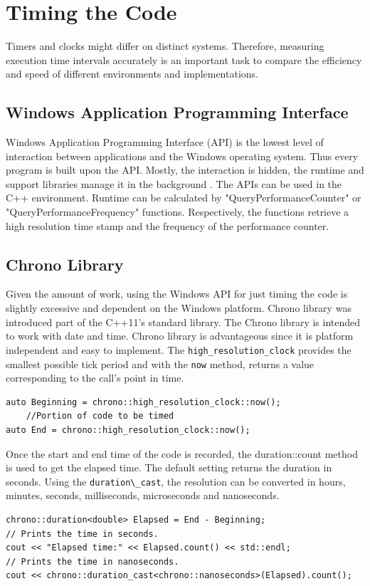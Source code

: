 \documentclass[12pt, oneside]{book}
\theoremstyle{plain}
\theoremstyle{definition}
\begin{document}
\section{Timing the Code}
Timers and clocks might differ on distinct systems. Therefore, measuring execution time intervals accurately is an important task to compare the efficiency and speed of different environments and implementations. 

\subsection{Windows Application Programming Interface}
Windows Application Programming Interface (API) is the lowest level of interaction between applications and the Windows operating system. Thus every program is built upon  the API. Mostly, the interaction is hidden, the runtime and support libraries manage it in the background \cite{windows}. The APIs can be used in the C++ environment. Runtime can be calculated by "QueryPerformanceCounter" or "QueryPerformanceFrequency"  functions. Respectively, the functions retrieve a high resolution time stamp and the frequency of the performance counter. 

\subsection{Chrono Library}
Given the amount of work, using the Windows API for just timing the code is slightly excessive and dependent on the Windows platform. Chrono library was introduced part of the C++11’s standard library. The Chrono library is intended to work with date and time. Chrono library is advantageous since it is platform independent and easy to implement. The \verb!high_resolution_clock! provides the smallest possible tick period and with the \verb!now! method, returns a value corresponding to the call’s point in time. 
\begin{verbatim}
auto Beginning = chrono::high_resolution_clock::now();
    //Portion of code to be timed
auto End = chrono::high_resolution_clock::now();
\end{verbatim}
Once the start and end time of the code is recorded, the duration::count method is used to get the elapsed time. The default setting returns the duration in seconds. Using the \verb!duration\_cast!, the resolution can be converted in hours, minutes, seconds, milliseconds, microseconds and nanoseconds.
\begin{verbatim}
chrono::duration<double> Elapsed = End - Beginning;
// Prints the time in seconds.
cout << "Elapsed time:" << Elapsed.count() << std::endl;
// Prints the time in nanoseconds. 
cout << chrono::duration_cast<chrono::nanoseconds>(Elapsed).count();
\end{verbatim}
\end{document}
